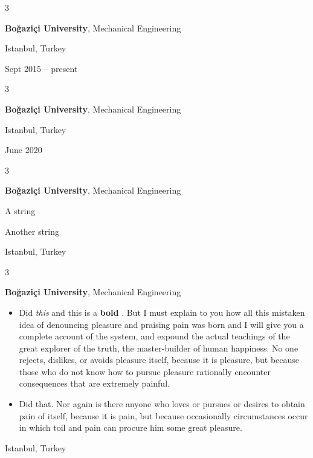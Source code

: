 \documentclass[10pt, letterpaper]{article}
\newenvironment{summary}{
    \begin{description}[
        topsep=0.10 cm,
        parsep=0.10 cm,
        partopsep=0pt,
        itemsep=0pt,
        leftmargin=0.4 cm + 10pt
    ]
}{
    \end{description}
} %
\newenvironment{highlights}{
    \begin{itemize}[
        topsep=0.10 cm,
        parsep=0.10 cm,
        partopsep=0pt,
        itemsep=0pt,
        leftmargin=0.4 cm + 10pt
    ]
}{
    \end{itemize}
} %
\newenvironment{threecolentry}[3][]{
    \onecolentry
    \def\thirdColumn{#3}
    \setcolumnwidth{1 cm, \fill, 4.5 cm}
    \begin{paracol}{3}
    {\raggedright #2} \switchcolumn
}{
    \switchcolumn \raggedleft \thirdColumn
    \end{paracol}
    \endonecolentry
} %
\let\hrefWithoutArrow\href
\renewcommand{\href}[2]{\hrefWithoutArrow{#1}{\ifthenelse{\equal{#2}{}}{ }{#2 }\raisebox{.15ex}{\footnotesize \faExternalLink*}}}
\begin{document}
        \vspace{0.2 cm}

        \begin{threecolentry}{\textbf{}}{
            Istanbul, Turkey

        Sept 2015 – present
        }
            \textbf{Boğaziçi University}, Mechanical Engineering
        \end{threecolentry}

        \vspace{0.2 cm}

        \begin{threecolentry}{\textbf{}}{
            Istanbul, Turkey

        June 2020
        }
            \textbf{Boğaziçi University}, Mechanical Engineering
        \end{threecolentry}

        \vspace{0.2 cm}

        \begin{threecolentry}{\textbf{}}{
            Istanbul, Turkey
        }
            \textbf{Boğaziçi University}, Mechanical Engineering
            \begin{summary}
                \item A string
                \item Another string
            \end{summary}
        \end{threecolentry}

        \vspace{0.2 cm}

        \begin{threecolentry}{\textbf{}}{
            Istanbul, Turkey
        }
            \textbf{Boğaziçi University}, Mechanical Engineering
            \begin{highlights}
                \item Did \textit{this} and this is a \textbf{bold} \href{https://example.com}{link}. But I must explain to you how all this mistaken idea of denouncing pleasure and praising pain was born and I will give you a complete account of the system, and expound the actual teachings of the great explorer of the truth, the master-builder of human happiness. No one rejects, dislikes, or avoids pleasure itself, because it is pleasure, but because those who do not know how to pursue pleasure rationally encounter consequences that are extremely painful.
                \item Did that. Nor again is there anyone who loves or pursues or desires to obtain pain of itself, because it is pain, but because occasionally circumstances occur in which toil and pain can procure him some great pleasure.
            \end{highlights}
        \end{threecolentry}
\end{document}
